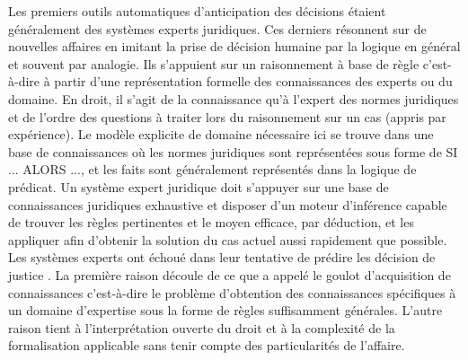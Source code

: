 Les premiers outils automatiques d'anticipation des décisions étaient généralement des systèmes experts juridiques. Ces derniers résonnent  sur de nouvelles affaires en imitant la prise de décision humaine par la logique en général et souvent par analogie. Ils s'appuient sur un raisonnement à base de règle c'est-à-dire à partir d'une représentation formelle des connaissances des experts ou du domaine. En droit, il s'agit de la connaissance qu'à l'expert des normes juridiques et de l'ordre des questions à traiter lors du raisonnement sur un cas (appris par expérience). Le modèle explicite de domaine nécessaire ici se trouve dans une base de connaissances où les normes juridiques sont représentées sous forme de \og SI ... ALORS ...\fg{}, et les faits sont généralement représentés dans la logique de prédicat. Un système expert juridique doit s’appuyer sur une base de connaissances juridiques exhaustive et disposer d’un moteur d’inférence capable de trouver les règles pertinentes et le moyen efficace, par déduction, et les appliquer afin d’obtenir la solution du cas actuel aussi rapidement que possible. Les systèmes experts ont échoué dans leur tentative de prédire les décision de justice \citep{leith2010risefall}. La première raison découle de ce que \citet{Berka2011rbr-cbr} a appelé le \og goulot d'acquisition de connaissances \fg{} c'est-à-dire le problème d'obtention des connaissances spécifiques à un domaine d’expertise sous la forme de règles suffisamment générales. L'autre raison tient à l'interprétation ouverte du droit et à la complexité de la formalisation applicable sans tenir compte des particularités de l'affaire.

